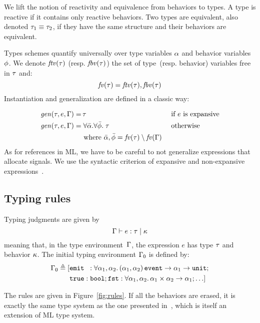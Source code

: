\documentclass[9pt,preprint]{sigplanconf}
\newcommand{\deq}{\triangleq}
\begin{document}
We lift the notion of reactivity and equivalence from behaviors to types. A type is reactive if it contains only reactive behaviors. Two types are equivalent, also denoted $\tau_1 \equiv \tau_2$, if they have the same structure and their behaviors are equivalent.

Types schemes quantify universally over type variables $\alpha$ and behavior variables $\phi$. We denote $\mathit{ftv}(\tau)$ (resp. $\mathit{fbv}(\tau)$) the set of type~(resp. behavior) variables free in $\tau$ and:
\[ \mathit{fv}(\tau) = \mathit{ftv}(\tau), \mathit{fbv}(\tau) \] 
Instantiation and generalization are defined in a classic way:
\vspace{-1.3em}
\begin{align*}
\mathit{gen}(\tau, e, \Gamma) = &\, \tau && \text { if $e$ is expansive} \\
\mathit{gen}(\tau, e, \Gamma) = &\; \forall \bar{\alpha}.\forall \bar{\phi}.\; \tau  && \text{ otherwise } \\
  & \text{ where }  \bar{\alpha}, \bar{\phi} = \mathit{fv}(\tau) \setminus \mathit{fv}(\Gamma)  
\end{align*}
As for references in ML, we have to be careful to not generalize expressions that allocate signals. We use the syntactic criterion of expansive and non-expansive expressions~\cite{Tofte:1990}.

\subsection{Typing rules}

Typing judgments are given by 
\[ \Gamma \vdash e : \tau \mid \kappa \] 
meaning that, in the type environment~$\Gamma$, the expression $e$ has type $\tau$ and behavior $\kappa$. The initial typing environment $\Gamma_0$ is defined by: 
\begin{align*}
\Gamma_0 \deq [
 &\eemit{}{} : \forall  \rtvar_1, \rtvar_2. \, 
        \rtarrow{ \rtsig{\rtvar_1}{\rtvar_2} }{\rtarrow{\rtvar_1}{\unit{}} }; \\
        &\mathtt{true} : \mathtt{bool};
              \mathtt{fst} : \forall \rtvar_1, \rtvar_2.\, \rtarrow{\rtprod{\rtvar_1}{\rtvar_2}}{\rtvar_1};  \ldots ]
\end{align*}

The rules are given in Figure~\ref{fig:rules}. If all the behaviors are erased, it is exactly the same type system as the one presented in~\cite{Mandel:2005}, which is itself an extension of ML type system. 
\end{document}
